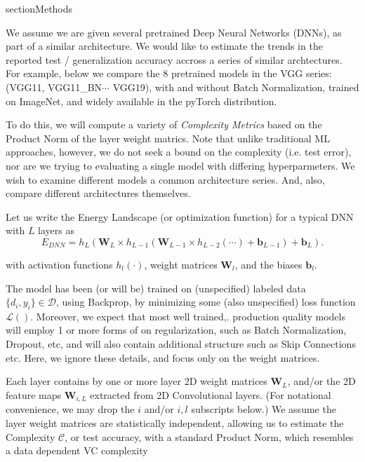 section{Methods}
\label{sxn:methods}

We assume we are given several pretrained Deep Neural Networks (DNNs), as part of a similar architecture.
We would like to estimate the trends in the reported test / generalization accuracy accross a series of similar archtectures.  
For example, below we compare the 8 pretrained models in the VGG series: (VGG11, VGG11\_BN$\cdots$ VGG19), with
and without Batch Normalization, trained on ImageNet, and widely available in the pyTorch distribution.

To do this, we will compute a variety of \emph{Complexity Metrics} based on the Product Norm of the layer weight matrics.
Note that unlike traditional ML approaches, however, we do not seek a bound on the complexity (i.e. test error), 
nor are we trying to evaluating a single model with differing hyperparmeters.  We wish to examine different models a 
common architecture series. And, also, compare different architectures themselves.  

Let us write the Energy Landscape (or optimization function) for a typical DNN with $L$ layers as
\begin{equation}
E_{DNN}=h_{L}(\mathbf{W}_{L}\times h_{L-1}(\mathbf{W}_{L-1}\times h_{L-2}(\cdots)+\mathbf{b}_{L-1})+\mathbf{b}_{L})  .
\label{eqn:dnn_energy}
\end{equation}

with activation functions $h_{l}(\cdot)$,  weight matrices $\mathbf{W}_{l}$, and the biases $\mathbf{b}_{l}$.

The model has been (or will be) trained on (unspecified) labeled data $\{d_{i},y_{i}\}\in\mathcal{D}$, 
using Backprop, by minimizing some (also unspecified) loss function $\mathcal{L}()$.  Moreover, we expect that most well trained,. production quality models will employ 1 or more forms of on regularization, such as Batch Normalization, Dropout, etc, and will also contain additional structure such as Skip Connections etc. Here, we ignore these details, and focus only on the weight matrices. 

Each layer contains by one or more layer 2D weight matrices $\mathbf{W}_{L}$, and/or the 2D feature maps $\mathbf{W}_{i,L}$ extracted from 2D Convolutional layers.  (For notational convenience, we may drop the $i$ and/or $i,l$ subscripts below.) We assume the layer weight matrices are statistically independent, allowing us to estimate the Complexity $\mathcal{C}$, or test accuracy, with a standard Product Norm, which resembles a data dependent VC complexity

